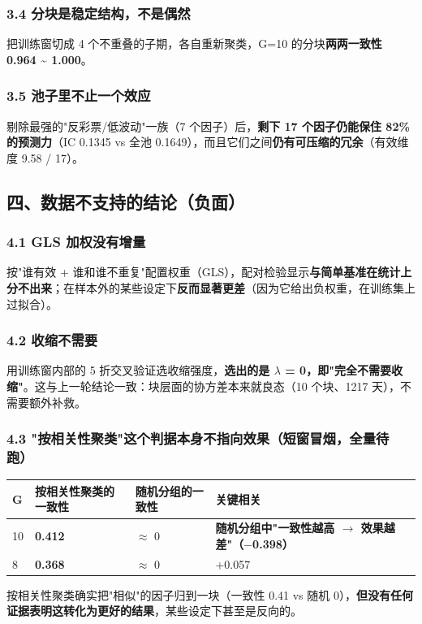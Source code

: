 \documentclass[11pt]{article}
\begin{document}
\subsubsection{\texorpdfstring{3.4 分块是稳定结构，不是偶然}{3.4 分块是稳定结构，不是偶然}}
把训练窗切成 4 个不重叠的子期，各自重新聚类，G=10 的分块\textbf{两两一致性 0.964 \textasciitilde{} 1.000}。
\subsubsection{\texorpdfstring{3.5 池子里不止一个效应}{3.5 池子里不止一个效应}}
剔除最强的"反彩票/低波动"一族（7 个因子）后，\textbf{剩下 17 个因子仍能保住 82\% 的预测力}（IC 0.1345 vs 全池 0.1649），而且它们之间\textbf{仍有可压缩的冗余}（有效维度 9.58 / 17）。
\subsection{\texorpdfstring{四、数据不支持的结论（负面）}{四、数据不支持的结论（负面）}}
\subsubsection{\texorpdfstring{4.1 GLS 加权没有增量}{4.1 GLS 加权没有增量}}
按"谁有效 + 谁和谁不重复"配置权重（GLS），配对检验显示\textbf{与简单基准在统计上分不出来}；在样本外的某些设定下\textbf{反而显著更差}（因为它给出负权重，在训练集上过拟合）。
\subsubsection{\texorpdfstring{4.2 收缩不需要}{4.2 收缩不需要}}
用训练窗内部的 5 折交叉验证选收缩强度，\textbf{选出的是 \ensuremath{\lambda} = 0，即"完全不需要收缩"}。这与上一轮结论一致：块层面的协方差本来就良态（10 个块、1217 天），不需要额外补救。
\subsubsection{\texorpdfstring{4.3 "按相关性聚类"这个判据本身不指向效果（\textbf{短窗冒烟，全量待跑}）}{4.3 "按相关性聚类"这个判据本身不指向效果（短窗冒烟，全量待跑）}}
{\small
\begin{longtable}{p{1.27cm}p{3.51cm}p{2.81cm}p{8.61cm}}
\toprule
G & 按相关性聚类的一致性 & 随机分组的一致性 & 关键相关 \\
\midrule
10 & \textbf{0.412} & \ensuremath{\approx} 0 & \textbf{随机分组中"一致性越高 \ensuremath{\rightarrow} 效果越差"（\ensuremath{-}0.398）} \\
8 & \textbf{0.368} & \ensuremath{\approx} 0 & +0.057 \\
\bottomrule
\end{longtable}
}
按相关性聚类确实把"相似"的因子归到一块（一致性 0.41 vs 随机 0），\textbf{但没有任何证据表明这转化为更好的结果}，某些设定下甚至是反向的。
\end{document}
